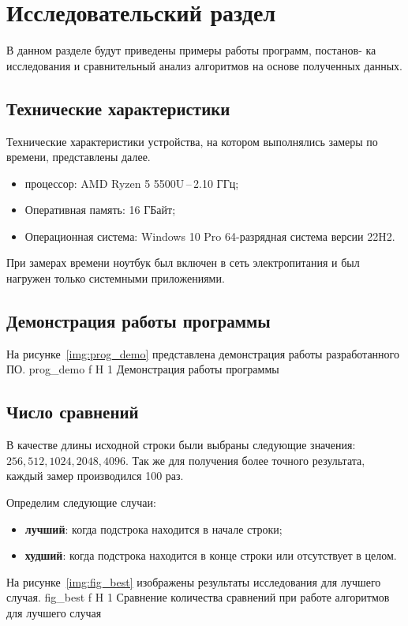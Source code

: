 \chapter{Исследовательский раздел}
В данном разделе будут приведены примеры работы программ, постанов-
ка исследования и сравнительный анализ алгоритмов на основе полученных
данных.

\section{Технические характеристики}
Технические характеристики устройства, на котором выполнялись замеры по времени, представлены далее.
\begin{itemize}
	\item процессор: AMD Ryzen 5 5500U\,--\,2.10 ГГц;
	\item Оперативная память: 16 ГБайт;
	\item Операционная система: Windows 10 Pro 64-разрядная система версии 22H2.
\end{itemize}

При замерах времени ноутбук был включен в сеть электропитания и был нагружен только системными приложениями.

\section{Демонстрация работы программы}
На рисунке~\ref{img:prog_demo} представлена демонстрация работы разработанного ПО.  
{prog_demo}
{f}
{H}
{1\textwidth}
{Демонстрация работы программы}

\section{Число сравнений}
В качестве длины исходной строки были выбраны следующие значения: $256, 512, 1024, 2048, 4096$. Так же для получения более точного результата, каждый замер производился 100 раз.

Определим следующие случаи:
\begin{itemize}
	\item \textbf{лучший}: когда подстрока находится в начале строки;
	\item \textbf{худший}: когда подстрока находится в конце строки или отсутствует в целом.
\end{itemize}

На рисунке~\ref{img:fig_best} изображены результаты исследования для лучшего случая.
{fig_best}
{f}
{H}
{1\textwidth}
{Сравнение количества сравнений при работе алгоритмов для лучшего случая}

